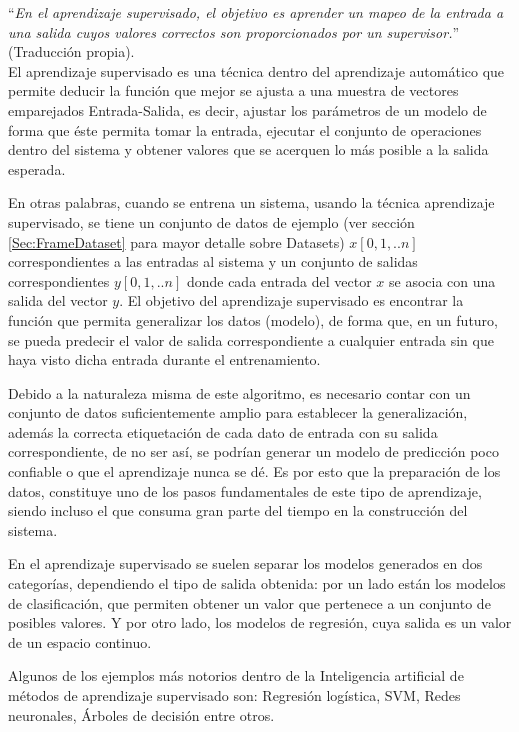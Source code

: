         ``\textit{En el aprendizaje supervisado, el objetivo es aprender un mapeo de la entrada a una salida cuyos valores correctos son proporcionados por un supervisor.}'' \cite[Pág. 11]{alpaydin2014ML} (Traducción propia).\\
        
        El aprendizaje supervisado es una técnica dentro del aprendizaje automático que permite deducir la función que mejor se ajusta a una muestra de vectores emparejados Entrada-Salida, es decir, ajustar los parámetros de un modelo de forma que éste permita tomar la entrada, ejecutar el conjunto de operaciones dentro del sistema y obtener valores que se acerquen lo más posible a la salida esperada. 
        
        En otras palabras, cuando se entrena un sistema, usando la técnica aprendizaje supervisado, se tiene un conjunto de datos de ejemplo (ver sección \ref{Sec:FrameDataset} para mayor detalle sobre Datasets) $x[0, 1, ..n]$ correspondientes a las entradas al sistema y un conjunto de salidas correspondientes $y[0, 1, ..n]$ donde cada entrada del vector $x$ se asocia con una salida del vector $y$. El objetivo del aprendizaje supervisado es encontrar la función que permita generalizar los datos (modelo), de forma que, en un futuro, se pueda predecir el valor de salida correspondiente a cualquier entrada sin que haya visto dicha entrada durante el entrenamiento.
        
        Debido a la naturaleza misma de este algoritmo, es necesario contar con un conjunto de datos suficientemente amplio para establecer la generalización, además la correcta etiquetación de cada dato de entrada con su salida correspondiente, de no ser así, se podrían generar un modelo de predicción poco confiable o que el aprendizaje nunca se dé. Es por esto que la preparación de los datos, constituye uno de los pasos fundamentales de este tipo de aprendizaje, siendo incluso el que consuma gran parte del tiempo en la construcción del sistema.
        
        En el aprendizaje supervisado se suelen separar los modelos generados en dos categorías, dependiendo el tipo de salida obtenida: por un lado están los modelos de clasificación, que permiten obtener un valor que pertenece a un conjunto de posibles valores. Y por otro lado, los modelos de regresión, cuya salida es un valor de un espacio continuo.
        
        Algunos de los ejemplos más notorios dentro de la Inteligencia artificial de métodos de aprendizaje supervisado son: Regresión logística, SVM, Redes neuronales, Árboles de decisión entre otros. 
    
